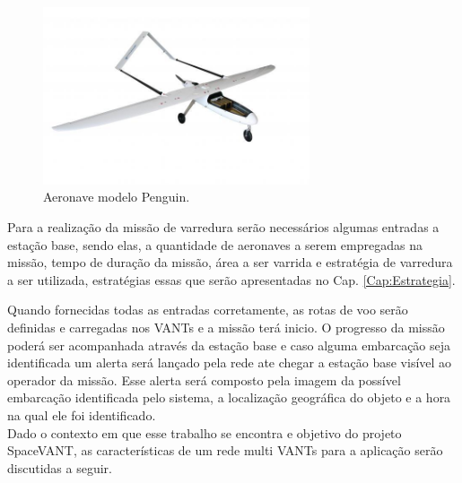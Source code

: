 \begin{figure} 
\center
\includegraphics[width=0.7\textwidth]{penguin.jpg}
\caption{Aeronave modelo Penguin.} 
\label{fig:penguin}
\end{figure}

Para a realização da missão de varredura serão necessários algumas entradas a estação base, sendo elas, a quantidade de aeronaves a serem empregadas na missão, tempo de duração da missão, área a ser varrida e estratégia de varredura a ser utilizada, estratégias essas que serão apresentadas no Cap. \ref{Cap:Estrategia}.

Quando fornecidas todas as entradas corretamente, as rotas de voo serão definidas e carregadas nos VANTs e a missão terá inicio. O progresso da missão poderá ser acompanhada através da estação base e caso alguma embarcação seja identificada um alerta será lançado pela rede ate chegar a estação base visível ao operador da missão. Esse alerta será composto pela imagem da possível embarcação identificada pelo sistema, a localização geográfica do objeto e a hora na qual ele foi identificado.\\  

Dado o contexto em que esse trabalho se encontra e objetivo do projeto SpaceVANT, as características de um rede multi VANTs para a aplicação serão discutidas a seguir.





 